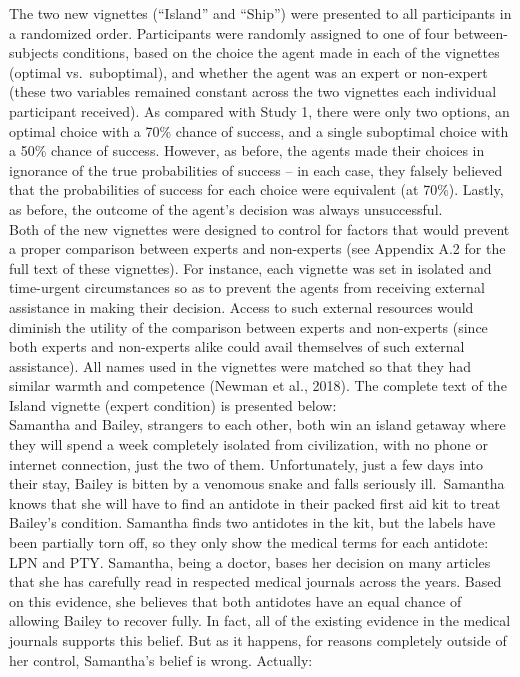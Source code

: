 \documentclass[
  man,floatsintext]{apa6}
\begin{document}
The two new vignettes (``Island'' and ``Ship'') were presented to all participants in a randomized order. Participants were randomly assigned to one of four between-subjects conditions, based on the choice the agent made in each of the vignettes (optimal vs.~suboptimal), and whether the agent was an expert or non-expert (these two variables remained constant across the two vignettes each individual participant received). As compared with Study 1, there were only two options, an optimal choice with a 70\% chance of success, and a single suboptimal choice with a 50\% chance of success. However, as before, the agents made their choices in ignorance of the true probabilities of success -- in each case, they falsely believed that the probabilities of success for each choice were equivalent (at 70\%). Lastly, as before, the outcome of the agent's decision was always unsuccessful.\\
Both of the new vignettes were designed to control for factors that would prevent a proper comparison between experts and non-experts (see Appendix A.2 for the full text of these vignettes). For instance, each vignette was set in isolated and time-urgent circumstances so as to prevent the agents from receiving external assistance in making their decision. Access to such external resources would diminish the utility of the comparison between experts and non-experts (since both experts and non-experts alike could avail themselves of such external assistance). All names used in the vignettes were matched so that they had similar warmth and competence (Newman et al., 2018). The complete text of the Island vignette (expert condition) is presented below:\\
Samantha and Bailey, strangers to each other, both win an island getaway where they will spend a week completely isolated from civilization, with no phone or internet connection, just the two of them. Unfortunately, just a few days into their stay, Bailey is bitten by a venomous snake and falls seriously ill.~Samantha knows that she will have to find an antidote in their packed first aid kit to treat Bailey's condition. Samantha finds two antidotes in the kit, but the labels have been partially torn off, so they only show the medical terms for each antidote: LPN and PTY. Samantha, being a doctor, bases her decision on many articles that she has carefully read in respected medical journals across the years. Based on this evidence, she believes that both antidotes have an equal chance of allowing Bailey to recover fully. In fact, all of the existing evidence in the medical journals supports this belief. But as it happens, for reasons completely outside of her control, Samantha's belief is wrong. Actually:\\
\end{document}
